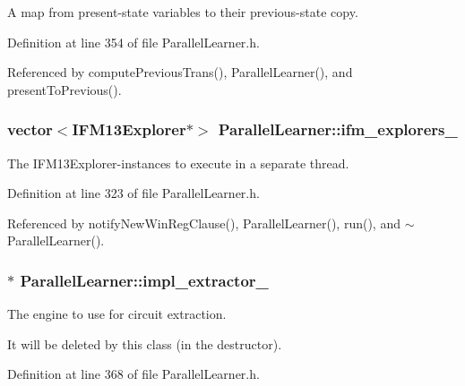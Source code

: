 A map from present-\/state variables to their previous-\/state copy. 



Definition at line 354 of file Parallel\-Learner.\-h.



Referenced by compute\-Previous\-Trans(), Parallel\-Learner(), and present\-To\-Previous().

\hypertarget{classParallelLearner_a614707a21f36d75a9fd06be57ee421d0}{
\subsubsection[{ifm\-\_\-explorers\-\_\-}]{\setlength{\rightskip}{0pt plus 5cm}vector$<${\bf I\-F\-M13\-Explorer}$\ast$$>$ Parallel\-Learner\-::ifm\-\_\-explorers\-\_\-\hspace{0.3cm}{\ttfamily [protected]}}}\label{classParallelLearner_a614707a21f36d75a9fd06be57ee421d0}


The I\-F\-M13\-Explorer-\/instances to execute in a separate thread. 



Definition at line 323 of file Parallel\-Learner.\-h.



Referenced by notify\-New\-Win\-Reg\-Clause(), Parallel\-Learner(), run(), and $\sim$\-Parallel\-Learner().

\hypertarget{classParallelLearner_a58b6113b54eb7c91bbf15546d575f5e8}{
\subsubsection[{impl\-\_\-extractor\-\_\-}]{$\ast$ Parallel\-Learner\-::impl\-\_\-extractor\-\_\-\hspace{0.3cm}{\ttfamily [protected]}}}\label{classParallelLearner_a58b6113b54eb7c91bbf15546d575f5e8}


The engine to use for circuit extraction. 

It will be deleted by this class (in the destructor). 

Definition at line 368 of file Parallel\-Learner.\-h.



